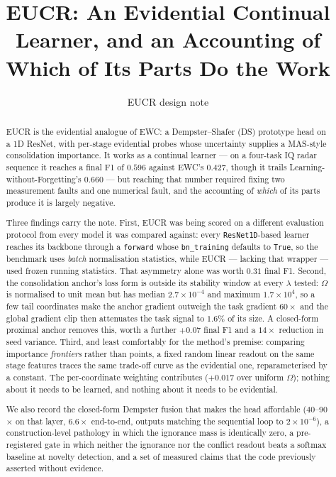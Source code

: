 \documentclass{article}
\title{EUCR: An Evidential Continual Learner, and an Accounting of
Which of Its Parts Do the Work}
\author{EUCR design note}
\date{}
\begin{document}
\maketitle

\begin{abstract}
EUCR is the evidential analogue of EWC: a Dempster--Shafer (DS) prototype head on
a 1D ResNet, with per-stage evidential probes whose uncertainty supplies a
MAS-style consolidation importance. It works as a continual learner --- on a
four-task IQ radar sequence it reaches a final F1 of $0.596$ against EWC's
$0.427$, though it trails Learning-without-Forgetting's $0.660$ --- but reaching
that number required fixing two measurement faults and one numerical fault, and
the accounting of \emph{which} of its parts produce it is largely negative.

Three findings carry the note. First, EUCR was being scored on a different
evaluation protocol from every model it was compared against: every
\texttt{ResNet1D}-based learner reaches its backbone through a \texttt{forward}
whose \texttt{bn\_training} defaults to \texttt{True}, so the benchmark uses
\emph{batch} normalisation statistics, while EUCR --- lacking that wrapper ---
used frozen running statistics. That asymmetry alone was worth $0.31$ final F1.
Second, the consolidation anchor's loss form is outside its stability window at
every $\lambda$ tested: $\Omega$ is normalised to unit mean but has median
$2.7\times10^{-4}$ and maximum $1.7\times10^{4}$, so a few tail coordinates make
the anchor gradient outweigh the task gradient $60\times$ and the global
gradient clip then attenuates the task signal to $1.6\%$ of its size. A
closed-form proximal anchor removes this, worth a further $+0.07$ final F1 and a
$14\times$ reduction in seed variance. Third, and least comfortably for the
method's premise: comparing importance \emph{frontiers} rather than points, a
fixed random linear readout on the same stage features traces the same
trade-off curve as the evidential one, reparameterised by a constant. The
per-coordinate weighting contributes ($+0.017$ over uniform $\Omega$); nothing
about it needs to be learned, and nothing about it needs to be evidential.

We also record the closed-form Dempster fusion that makes the head affordable
(40--90$\times$ on that layer, $6.6\times$ end-to-end, outputs matching the
sequential loop to $2\times10^{-6}$), a construction-level pathology in which the
ignorance mass is identically zero, a pre-registered gate in which neither the
ignorance nor the conflict readout beats a softmax baseline at novelty
detection, and a set of measured claims that the code previously asserted
without evidence.
\end{abstract}
\end{document}

